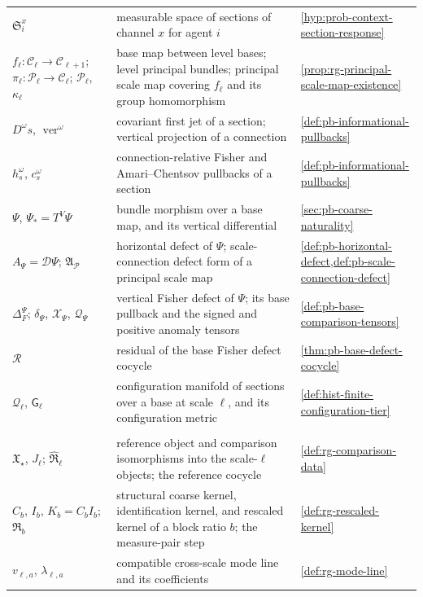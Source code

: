 {\begin{longtable}{@{}>{\raggedright\arraybackslash}p{}
>{\raggedright\arraybackslash}p{}
>{\raggedright\arraybackslash}p{}@{}}
$\mathfrak S_i^x$ & measurable space of sections of channel $x$ for agent $i$ & \cref{hyp:prob-context-section-response} \\
$f_\ell:\mathcal C_\ell\to\mathcal C_{\ell+1}$; $\pi_\ell:\mathscr P_\ell\to\mathcal C_\ell$; $\mathcal P_\ell$, $\kappa_\ell$ & base map between level bases; level principal bundles; principal scale map covering $f_\ell$ and its group homomorphism & \cref{prop:rg-principal-scale-map-existence} \\
$D^\omega s$, $\operatorname{ver}^\omega$ & covariant first jet of a section; vertical projection of a connection & \cref{def:pb-informational-pullbacks} \\
$h^\omega_s$, $c^\omega_s$ & connection-relative Fisher and Amari--Chentsov pullbacks of a section & \cref{def:pb-informational-pullbacks} \\
$\Psi$, $\Psi_*=T^V\Psi$ & bundle morphism over a base map, and its vertical differential & \cref{sec:pb-coarse-naturality} \\
$A_\Psi=\mathcal D\Psi$; $\mathfrak A_{\mathcal P}$ & horizontal defect of $\Psi$; scale-connection defect form of a principal scale map & \cref{def:pb-horizontal-defect,def:pb-scale-connection-defect} \\
$\Delta_F^\Psi$; $\delta_\Psi$, $\mathcal X_\Psi$, $\mathcal Q_\Psi$ & vertical Fisher defect of $\Psi$; its base pullback and the signed and positive anomaly tensors & \cref{def:pb-base-comparison-tensors} \\
$\mathcal R$ & residual of the base Fisher defect cocycle & \cref{thm:pb-base-defect-cocycle} \\
$\mathcal Q_\ell$, $\mathsf G_\ell$ & configuration manifold of sections over a base at scale $\ell$, and its configuration metric & \cref{def:hist-finite-configuration-tier} \\
\multicolumn{3}{@{}l}{\textbf{Infinite networks and Wilsonian asymptotics}} \\
$\mathfrak X_\star$, $J_\ell$; $\widehat{\mathfrak R}_\ell$ & reference object and comparison isomorphisms into the scale-$\ell$ objects; the reference cocycle & \cref{def:rg-comparison-data} \\
$C_b$, $I_b$, $K_b=C_bI_b$; $\mathfrak R_b$ & structural coarse kernel, identification kernel, and rescaled kernel of a block ratio $b$; the measure-pair step & \cref{def:rg-rescaled-kernel} \\
$v_{\ell,a}$, $\lambda_{\ell,a}$ & compatible cross-scale mode line and its coefficients & \cref{def:rg-mode-line} \\

\end{longtable}}
